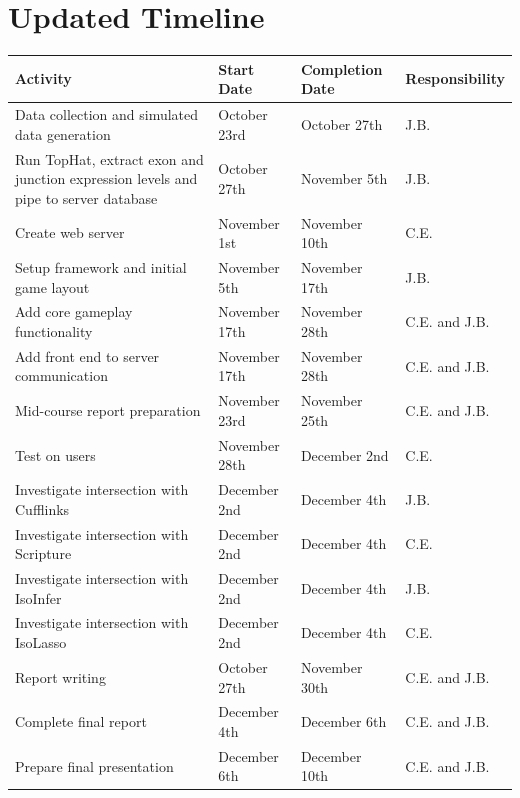 \documentclass[12pt]{article}
\begin{document}
\section{Updated Timeline}
\begin{tabularx}{\linewidth}{X || l || l || X}
\textbf{Activity} & \textbf{Start Date} & \textbf{Completion Date} & \textbf{Responsibility} \\ 
\hline
Data collection and simulated data generation\footnotemark[1] & October 23rd & October 27th & J.B. \\
\hline
Run TopHat, extract exon and junction expression levels and pipe to server database\footnotemark[1] & October 27th & November 5th & J.B. \\
\hline
Create web server\footnotemark[2] & November 1st & November 10th & C.E. \\
\hline
Setup framework and initial game layout\footnotemark[1] & November 5th & November 17th & J.B. \\
\hline
Add core gameplay functionality\footnotemark[2] & November 17th & November 28th & C.E. and J.B.  \\
\hline
Add front end to server communication\footnotemark[2] & November 17th & November 28th & C.E. and J.B.  \\
\hline
Mid-course report preparation\footnotemark[2] & November 23rd & November 25th & C.E. and J.B. \\
\hline
Test on users & November 28th & December 2nd & C.E. \\
\hline
Investigate intersection with Cufflinks & December 2nd & December 4th & J.B. \\
\hline
Investigate intersection with Scripture & December 2nd & December 4th & C.E. \\
\hline
Investigate intersection with IsoInfer\footnotemark[3] & December 2nd & December 4th & J.B. \\
\hline
Investigate intersection with IsoLasso\footnotemark[3] & December 2nd & December 4th & C.E. \\
\hline
Report writing & October 27th & November 30th & C.E. and J.B. \\
\hline
Complete final report & December 4th & December 6th & C.E. and J.B. \\
\hline
Prepare final presentation & December 6th & December 10th & C.E. and J.B. \\
\end{tabularx}

\end{document}
